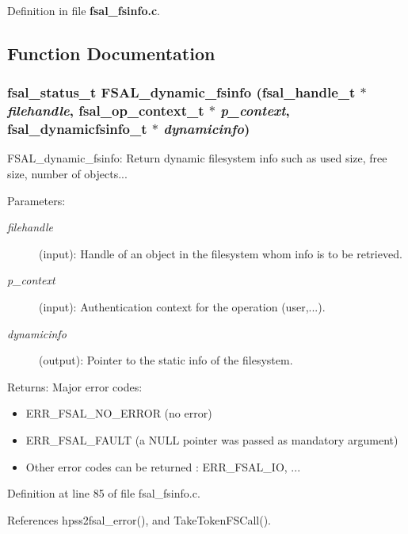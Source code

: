 Definition in file {\bf fsal\_\-fsinfo.c}.

\subsection{Function Documentation}
\subsubsection{\setlength{\rightskip}{0pt plus 5cm}fsal\_\-status\_\-t FSAL\_\-dynamic\_\-fsinfo (fsal\_\-handle\_\-t $\ast$ {\em filehandle}, fsal\_\-op\_\-context\_\-t $\ast$ {\em p\_\-context}, fsal\_\-dynamicfsinfo\_\-t $\ast$ {\em dynamicinfo})}\label{fsal__fsinfo_8c_a1}


FSAL\_\-dynamic\_\-fsinfo: Return dynamic filesystem info such as used size, free size, number of objects...

\begin{Desc}
\item[Parameters:]
\begin{description}
\item[{\em filehandle}](input): Handle of an object in the filesystem whom info is to be retrieved. \item[{\em p\_\-context}](input): Authentication context for the operation (user,...). \item[{\em dynamicinfo}](output): Pointer to the static info of the filesystem.\end{description}
\end{Desc}
\begin{Desc}
\item[Returns:]Major error codes:\begin{itemize}
\item ERR\_\-FSAL\_\-NO\_\-ERROR (no error)\item ERR\_\-FSAL\_\-FAULT (a NULL pointer was passed as mandatory argument)\item Other error codes can be returned : ERR\_\-FSAL\_\-IO, ... \end{itemize}
\end{Desc}


Definition at line 85 of file fsal\_\-fsinfo.c.

References hpss2fsal\_\-error(), and Take\-Token\-FSCall().
